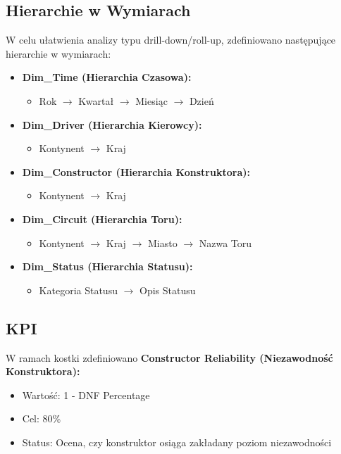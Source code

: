 \documentclass[a4paper,12pt]{article}
\begin{document}
\subsection{Hierarchie w Wymiarach}
W celu ułatwienia analizy typu drill-down/roll-up, zdefiniowano następujące hierarchie w wymiarach:
\begin{itemize}
  \item \textbf{Dim\_Time (Hierarchia Czasowa):}
        \begin{itemize}
          \item Rok $\rightarrow$ Kwartał $\rightarrow$ Miesiąc $\rightarrow$ Dzień
        \end{itemize}
  \item \textbf{Dim\_Driver (Hierarchia Kierowcy):}
        \begin{itemize}
          \item Kontynent $\rightarrow$ Kraj
        \end{itemize}
  \item \textbf{Dim\_Constructor (Hierarchia Konstruktora):}
        \begin{itemize}
          \item Kontynent $\rightarrow$ Kraj
        \end{itemize}
  \item \textbf{Dim\_Circuit (Hierarchia Toru):}
        \begin{itemize}
          \item Kontynent $\rightarrow$ Kraj $\rightarrow$ Miasto $\rightarrow$ Nazwa Toru
        \end{itemize}
  \item \textbf{Dim\_Status (Hierarchia Statusu):}
        \begin{itemize}
          \item Kategoria Statusu $\rightarrow$ Opis Statusu
        \end{itemize}
\end{itemize}

\subsection{KPI}

W ramach kostki zdefiniowano \textbf{Constructor Reliability (Niezawodność Konstruktora):}

\begin{itemize}
  \item Wartość: 1 - DNF Percentage
  \item Cel: 80\%
  \item Status: Ocena, czy konstruktor osiąga zakładany poziom niezawodności
\end{itemize}
\end{document}

